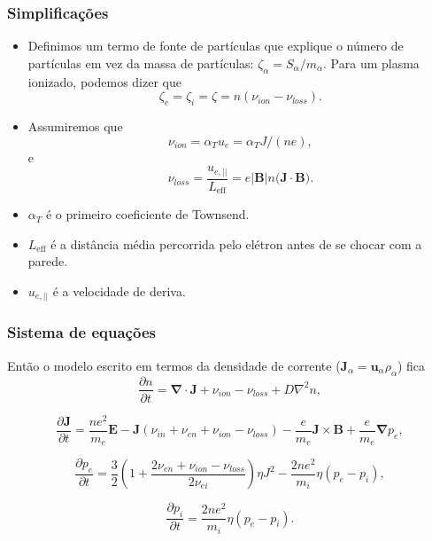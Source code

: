 \documentclass[aspectratio=169]{beamer}
\begin{document}
		\begin{frame}
		\frametitle{Simplificações}
		\begin{itemize}
		\item  Definimos um termo de fonte de partículas que explique o número de partículas em vez da massa de partículas: $\zeta_\alpha = S_\alpha / m_\alpha$. Para um plasma ionizado, podemos dizer que 
		$$\zeta_e = \zeta_i = \zeta = n(\nu_{ion} - \nu_{loss}).$$ 
\item Assumiremos que $$\nu_{ion} = \alpha_T u_e = \alpha_T J / (ne),$$ e $$\nu_{loss} = \frac{u_{e, ||}}{L_{\mathrm{eff}} }= e |\bm{B}| n \big( \bm{J} \cdot \bm{B}  \big).$$ 
\item $\alpha_T$ é o primeiro coeficiente de Townsend.

\item $L_\mathrm{eff}$ é a distância média percorrida pelo elétron antes de se chocar com a parede.
\item $u_{e, ||}$ é a velocidade de deriva.
		\end{itemize}
		\end{frame}	
 	\begin{frame}
		\frametitle{Sistema de equações}
		Então o modelo escrito em termos da densidade de corrente ($\bm{J}_\alpha=\bm{u}_\alpha \rho_\alpha$) fica
\begin{equation}
\frac{\partial n}{\partial t} = \bm{\nabla} \cdot \bm{J}+\nu_{ion} - \nu_{loss}+D\nabla^2n,
\end{equation}

\begin{equation}
\label{momenteletrico} 
\frac{\partial \bm{J}}{\partial t} =  \frac{ne^2}{m_e} \bm{E} -\bm{J}(\nu_{in}+\nu_{en}+\nu_{ion}-\nu_{loss}) -\frac{e}{m_e}\bm{J} \times \bm{B}+\frac{e}{m_e}\bm{\nabla} p_e,
\end{equation}

\begin{equation}
\frac{\partial p_e}{\partial t} = \frac{3}{2}(1+\frac{2 \nu_{en} + \nu_{ion} - \nu_{loss}}{2\nu_{ei}})\eta J^2  -\frac{2ne^2}{m_i} \eta (p_e-p_i),
\end{equation}

\begin{equation}
\frac{\partial p_i}{\partial t} = \frac{2ne^2}{m_i}\eta(p_e-p_i).
\end{equation}

\end{frame}
\end{document}
